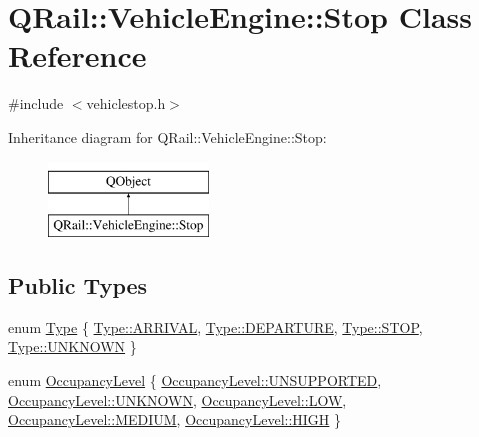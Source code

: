 \hypertarget{classQRail_1_1VehicleEngine_1_1Stop}{}\section{Q\+Rail\+::Vehicle\+Engine\+::Stop Class Reference}
\label{classQRail_1_1VehicleEngine_1_1Stop}


{\ttfamily \#include $<$vehiclestop.\+h$>$}

Inheritance diagram for Q\+Rail\+::Vehicle\+Engine\+::Stop\+:\begin{figure}[H]
\begin{center}
\leavevmode
\includegraphics[height=2.000000cm]{classQRail_1_1VehicleEngine_1_1Stop}
\end{center}
\end{figure}
\subsection*{Public Types}
\begin{DoxyCompactItemize}
\item 
enum \mbox{\hyperlink{classQRail_1_1VehicleEngine_1_1Stop_af078938bc06ff906b6fc843d8c0206fa}{Type}} \{ \mbox{\hyperlink{classQRail_1_1VehicleEngine_1_1Stop_af078938bc06ff906b6fc843d8c0206faad5f52d91ac49fd146727f4710767dd08}{Type\+::\+A\+R\+R\+I\+V\+AL}}, 
\mbox{\hyperlink{classQRail_1_1VehicleEngine_1_1Stop_af078938bc06ff906b6fc843d8c0206faae7cc381a17e714e7ba15ef6f9858304e}{Type\+::\+D\+E\+P\+A\+R\+T\+U\+RE}}, 
\mbox{\hyperlink{classQRail_1_1VehicleEngine_1_1Stop_af078938bc06ff906b6fc843d8c0206faa615a46af313786fc4e349f34118be111}{Type\+::\+S\+T\+OP}}, 
\mbox{\hyperlink{classQRail_1_1VehicleEngine_1_1Stop_af078938bc06ff906b6fc843d8c0206faa696b031073e74bf2cb98e5ef201d4aa3}{Type\+::\+U\+N\+K\+N\+O\+WN}}
 \}
\item 
enum \mbox{\hyperlink{classQRail_1_1VehicleEngine_1_1Stop_ad967ed81b19762bd582c1af07354a6d4}{Occupancy\+Level}} \{ \newline
\mbox{\hyperlink{classQRail_1_1VehicleEngine_1_1Stop_ad967ed81b19762bd582c1af07354a6d4a40aa75f8e8cfdf7b660c5620e953229f}{Occupancy\+Level\+::\+U\+N\+S\+U\+P\+P\+O\+R\+T\+ED}}, 
\mbox{\hyperlink{classQRail_1_1VehicleEngine_1_1Stop_ad967ed81b19762bd582c1af07354a6d4a696b031073e74bf2cb98e5ef201d4aa3}{Occupancy\+Level\+::\+U\+N\+K\+N\+O\+WN}}, 
\mbox{\hyperlink{classQRail_1_1VehicleEngine_1_1Stop_ad967ed81b19762bd582c1af07354a6d4a41bc94cbd8eebea13ce0491b2ac11b88}{Occupancy\+Level\+::\+L\+OW}}, 
\mbox{\hyperlink{classQRail_1_1VehicleEngine_1_1Stop_ad967ed81b19762bd582c1af07354a6d4ac87f3be66ffc3c0d4249f1c2cc5f3cce}{Occupancy\+Level\+::\+M\+E\+D\+I\+UM}}, 
\newline
\mbox{\hyperlink{classQRail_1_1VehicleEngine_1_1Stop_ad967ed81b19762bd582c1af07354a6d4ab89de3b4b81c4facfac906edf29aec8c}{Occupancy\+Level\+::\+H\+I\+GH}}
 \}
\end{DoxyCompactItemize}
